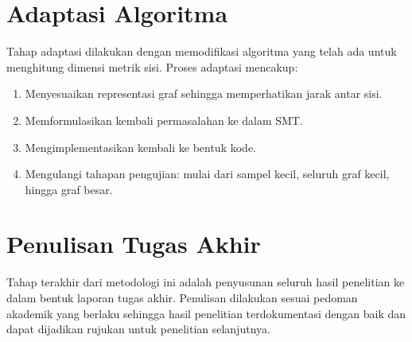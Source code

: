 \section{Adaptasi Algoritma}

Tahap adaptasi dilakukan dengan memodifikasi algoritma yang telah ada untuk menghitung dimensi metrik sisi. Proses adaptasi mencakup:

\begin{enumerate}

	\item Menyesuaikan representasi graf sehingga memperhatikan jarak antar sisi.

	\item Memformulasikan kembali permasalahan ke dalam SMT.

	\item Mengimplementasikan kembali ke bentuk kode.

	\item Mengulangi tahapan pengujian: mulai dari sampel kecil, seluruh graf kecil, hingga graf besar.

\end{enumerate}

\section{Penulisan Tugas Akhir}

Tahap terakhir dari metodologi ini adalah penyusunan seluruh hasil penelitian ke dalam bentuk laporan tugas akhir. Penulisan dilakukan sesuai pedoman akademik yang berlaku sehingga hasil penelitian terdokumentasi dengan baik dan dapat dijadikan rujukan untuk penelitian selanjutnya.
